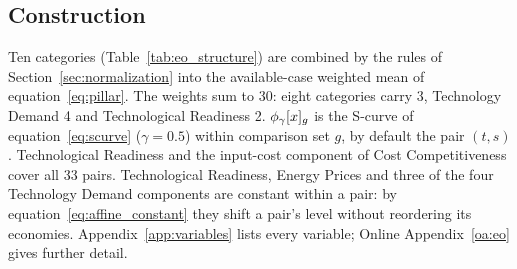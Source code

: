 \subsection{Construction}\label{subsec:eo_aggregation}

Ten categories (Table~\ref{tab:eo_structure}) are combined by the rules of
Section~\ref{sec:normalization} into the available-case weighted mean of
equation~\eqref{eq:pillar}. The weights sum to 30: eight categories carry 3, Technology Demand 4
and Technological Readiness 2. $\phi_{\gamma}[x]_g$ is the S-curve of equation~\eqref{eq:scurve}
($\gamma=0.5$) within comparison set $g$, by default the pair $(t,s)$. Technological Readiness and
the input-cost component of Cost Competitiveness cover all 33 pairs. Technological Readiness,
Energy Prices and three of the four Technology Demand components are constant within a pair: by
equation~\eqref{eq:affine_constant} they shift a pair's level without reordering its economies.
Appendix~\ref{app:variables} lists every variable; Online Appendix~\ref{oa:eo} gives further
detail.

